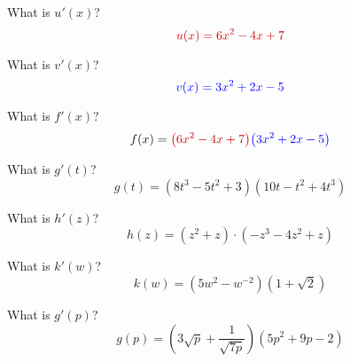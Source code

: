 
\begin{ProblemSet}[pencil space=2in]

 \begin{Problem}[pencil space=1in]
  What is $u'(x)$?
  \begin{equation*}
   \LeftStyle{u(x) = 6 x^2 - 4x + 7}
  \end{equation*}
 \end{Problem}

 \begin{Problem}[pencil space=1in]
  What is $v'(x)$?
  \begin{equation*}
   \textcolor{blue}{v(x) = 3 x^2 + 2 x - 5}
  \end{equation*}
 \end{Problem}

 \begin{Problem}[pencil space=3in]
  What is $f'(x)$?
  \begin{equation*}
   f(x) =
   \LeftStyle{\left(6 x^2 - 4x + 7\right)}
   \RightStyle{\left(3 x^2 + 2 x - 5\right)}
  \end{equation*}
 \end{Problem}

 \begin{Problem}
  What is $g'(t)$?
  \begin{equation*}
   g(t) = \left(8 t^3 - 5t^2 + 3\right)\left(10t - t^2 + 4t^3\right)
  \end{equation*}
 \end{Problem}

 \begin{Problem}
  What is $h'(z)$?
  \begin{equation*}
   h(z) = (z^2+z)\cdot\left(-z^3 - 4z^2 + z\right)
  \end{equation*}
 \end{Problem}

 \begin{Problem}
  What is $k'(w)$?
  \begin{equation*}
   k(w) = \left(5w^2 - w^{-2}\right)\left(1 + \sqrt{2}\right)
  \end{equation*}
 \end{Problem}

 \begin{Problem}
  What is $g'(p)$?
  \begin{equation*}
   g(p) = \left(3\sqrt{p} + \frac{1}{\sqrt{7p}}\right)(5 p^2 + 9 p - 2)
  \end{equation*}
 \end{Problem}

\end{ProblemSet}

